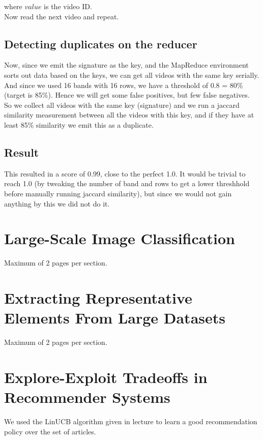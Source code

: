 \documentclass[a4paper, 11pt]{article}
\begin{document}
                where $value$ is the video ID.\\
                Now read the next video and repeat.
                
        \subsection{Detecting duplicates on the reducer}
                Now, since we emit the signature as the key, and the MapReduce environment sorts out data based on the keys, we can get all videos with the same key serially. And since we used 16 bands with 16 rows, we have a threshold of 0.8 = 80\% (target is 85\%). Hence we will get some false positives, but few false negatives.\\

                So we collect all videos with the same key (signature) and we run a jaccard similarity measurement between all the videos with this key, and if they have at least 85\% similarity we emit this as a duplicate.

        \subsection{Result}
                This resulted in a score of 0.99, close to the perfect 1.0. It would be trivial to reach 1.0  (by tweaking the number of band and rows to get a lower threshhold before manually running jaccard similarity), but since we would not gain anything by this we did not do it. 

\section{Large-Scale Image Classification}
Maximum of 2 pages per section.

\section{Extracting Representative Elements From Large Datasets}
Maximum of 2 pages per section.

\newpage

\section{Explore-Exploit Tradeoffs in Recommender Systems}

We used the LinUCB algorithm given in lecture to learn a good recommendation policy over the set of articles.
\end{document}
